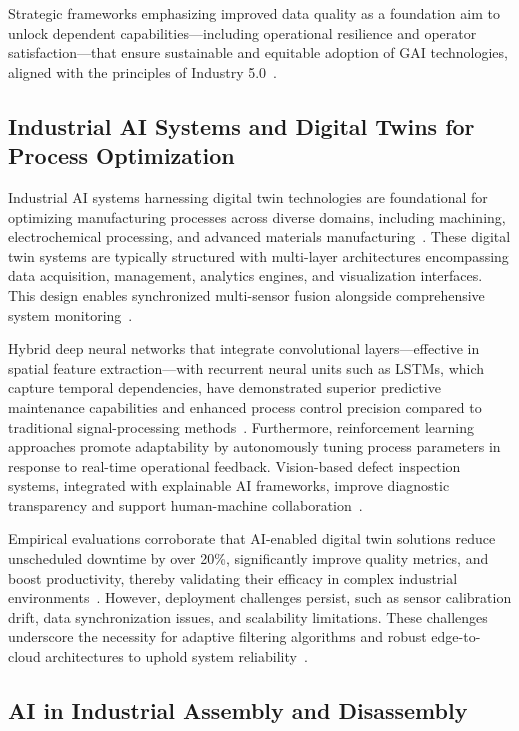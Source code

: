 \documentclass[sigconf]{acmart}
\begin{document}
Strategic frameworks emphasizing improved data quality as a foundation aim to unlock dependent capabilities—including operational resilience and operator satisfaction—that ensure sustainable and equitable adoption of GAI technologies, aligned with the principles of Industry 5.0~\cite{ref1}.

\subsection{Industrial AI Systems and Digital Twins for Process Optimization}

Industrial AI systems harnessing digital twin technologies are foundational for optimizing manufacturing processes across diverse domains, including machining, electrochemical processing, and advanced materials manufacturing~\cite{ref6,ref33}. These digital twin systems are typically structured with multi-layer architectures encompassing data acquisition, management, analytics engines, and visualization interfaces. This design enables synchronized multi-sensor fusion alongside comprehensive system monitoring~\cite{ref35,ref45}.  

Hybrid deep neural networks that integrate convolutional layers—effective in spatial feature extraction—with recurrent neural units such as LSTMs, which capture temporal dependencies, have demonstrated superior predictive maintenance capabilities and enhanced process control precision compared to traditional signal-processing methods~\cite{ref4,ref15,ref38}. Furthermore, reinforcement learning approaches promote adaptability by autonomously tuning process parameters in response to real-time operational feedback. Vision-based defect inspection systems, integrated with explainable AI frameworks, improve diagnostic transparency and support human-machine collaboration~\cite{ref39}.  

Empirical evaluations corroborate that AI-enabled digital twin solutions reduce unscheduled downtime by over 20\%, significantly improve quality metrics, and boost productivity, thereby validating their efficacy in complex industrial environments~\cite{ref31,ref36}. However, deployment challenges persist, such as sensor calibration drift, data synchronization issues, and scalability limitations. These challenges underscore the necessity for adaptive filtering algorithms and robust edge-to-cloud architectures to uphold system reliability~\cite{ref34}.

\subsection{AI in Industrial Assembly and Disassembly}
\end{document}
